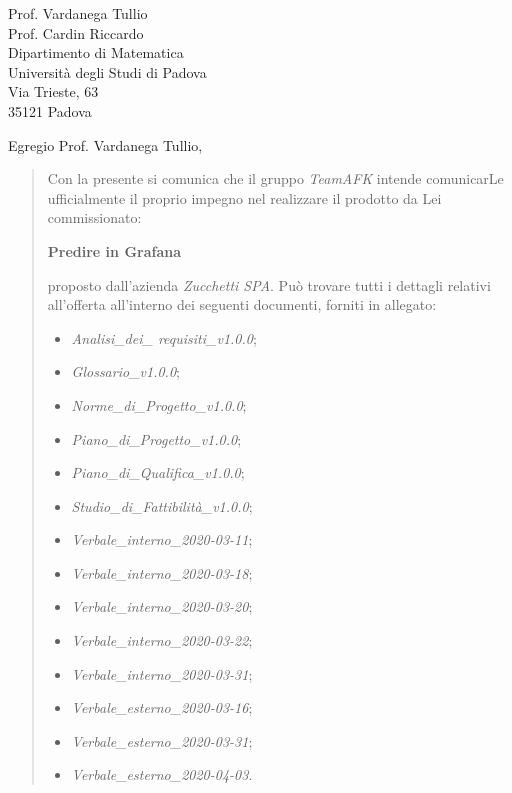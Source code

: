 \begin{letter}{
		Prof. Vardanega Tullio \\
		Prof. Cardin Riccardo \\
		Dipartimento di Matematica \\
		Università degli Studi di Padova \\
		Via Trieste, 63 \\
		35121 Padova}
		
\opening{Egregio Prof. Vardanega Tullio,}

\begin{quotation}
Con la presente si comunica che il gruppo \textit{TeamAFK} intende 
comunicarLe ufficialmente il proprio impegno nel realizzare il prodotto da Lei 
commissionato:

\begin{center}
	\textbf{Predire in Grafana}
\end{center}

\noindent proposto dall'azienda \textit{Zucchetti SPA}.
Può trovare tutti i dettagli relativi all'offerta all'interno dei seguenti 
documenti, forniti in allegato:

\begin{itemize}
	\item \textit{Analisi\_dei\_ requisiti\_v1.0.0};
	
	\item \textit{Glossario\_v1.0.0};
	
	\item \textit{Norme\_di\_Progetto\_v1.0.0};

	\item \textit{Piano\_di\_Progetto\_v1.0.0};

	\item \textit{Piano\_di\_Qualifica\_v1.0.0};

	\item \textit{Studio\_di\_Fattibilità\_v1.0.0};

	\item \textit{Verbale\_interno\_2020-03-11};
	\item \textit{Verbale\_interno\_2020-03-18};
	\item \textit{Verbale\_interno\_2020-03-20};
	\item \textit{Verbale\_interno\_2020-03-22};
	\item \textit{Verbale\_interno\_2020-03-31};
	\item \textit{Verbale\_esterno\_2020-03-16};
	\item \textit{Verbale\_esterno\_2020-03-31};
	\item \textit{Verbale\_esterno\_2020-04-03}.
\end{itemize}


\end{quotation}
\end{letter}
